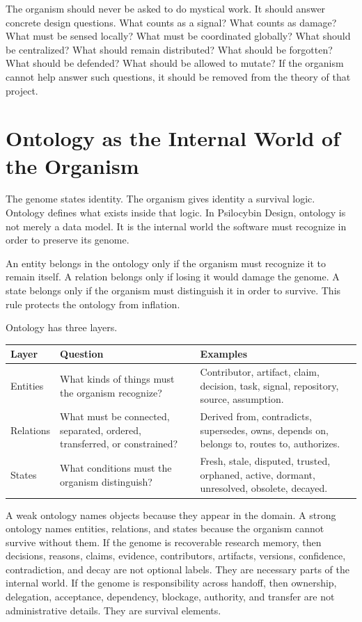 \documentclass[11pt]{article}
\begin{document}
The organism should never be asked to do mystical work. It should answer concrete design questions. What counts as a signal? What counts as damage? What must be sensed locally? What must be coordinated globally? What should be centralized? What should remain distributed? What should be forgotten? What should be defended? What should be allowed to mutate? If the organism cannot help answer such questions, it should be removed from the theory of that project.

\section{Ontology as the Internal World of the Organism}

The genome states identity. The organism gives identity a survival logic. Ontology defines what exists inside that logic. In Psilocybin Design, ontology is not merely a data model. It is the internal world the software must recognize in order to preserve its genome.

An entity belongs in the ontology only if the organism must recognize it to remain itself. A relation belongs only if losing it would damage the genome. A state belongs only if the organism must distinguish it in order to survive. This rule protects the ontology from inflation.

Ontology has three layers.

\begin{longtable}{|p{}|p{}|p{}|}
\hline
\textbf{Layer} & \textbf{Question} & \textbf{Examples} \\
\hline
Entities & What kinds of things must the organism recognize? & Contributor, artifact, claim, decision, task, signal, repository, source, assumption. \\
\hline
Relations & What must be connected, separated, ordered, transferred, or constrained? & Derived from, contradicts, supersedes, owns, depends on, belongs to, routes to, authorizes. \\
\hline
States & What conditions must the organism distinguish? & Fresh, stale, disputed, trusted, orphaned, active, dormant, unresolved, obsolete, decayed. \\
\hline
\end{longtable}

A weak ontology names objects because they appear in the domain. A strong ontology names entities, relations, and states because the organism cannot survive without them. If the genome is recoverable research memory, then decisions, reasons, claims, evidence, contributors, artifacts, versions, confidence, contradiction, and decay are not optional labels. They are necessary parts of the internal world. If the genome is responsibility across handoff, then ownership, delegation, acceptance, dependency, blockage, authority, and transfer are not administrative details. They are survival elements.
\end{document}
